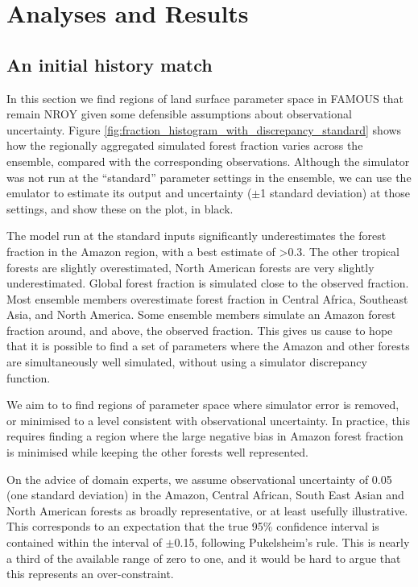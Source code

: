 \documentclass[esd, article]{copernicus} %
\begin{document}
\section{Analyses and Results}\label{AnalysesandResults}

\subsection{An initial history match}\label{ssec:initialhistorymatch}
In this section we find regions of land surface parameter space in FAMOUS that remain NROY given some defensible assumptions about observational uncertainty.  Figure \ref{fig:fraction_histogram_with_discrepancy_standard} shows how the regionally aggregated simulated forest fraction varies across the ensemble, compared with the corresponding observations. Although the simulator was not run at the ``standard'' parameter settings in the ensemble, we can use the emulator to estimate its output and uncertainty ($\pm$1 standard deviation) at those settings, and show these on the plot, in black.

The model run at the standard inputs significantly underestimates the forest fraction in the Amazon region, with a best estimate of >0.3. The other tropical forests are slightly overestimated, North American forests are very slightly underestimated. Global forest fraction is simulated close to the observed fraction. Most ensemble members overestimate forest fraction in Central Africa, Southeast Asia, and North America. Some ensemble members simulate an Amazon forest fraction around, and above, the observed fraction. This gives us cause to hope that it is possible to find a set of parameters where the Amazon and other forests are simultaneously well simulated, without using a simulator discrepancy function. 



We aim to to find regions of parameter space where simulator error is removed, or minimised to a level consistent with observational uncertainty. In practice, this requires finding a region where the large negative bias in Amazon forest fraction is minimised while keeping the other forests well represented.

On the advice of domain experts, we assume observational uncertainty of 0.05 (one standard deviation) in the Amazon, Central African, South East Asian and North American forests as broadly representative, or at least usefully illustrative. This corresponds to an expectation that the true 95\% confidence interval is contained within the interval of $\pm$0.15, following Pukelsheim's rule. This is nearly a third of the available range of zero to one, and it would be hard to argue that this represents an over-constraint.
\end{document}
